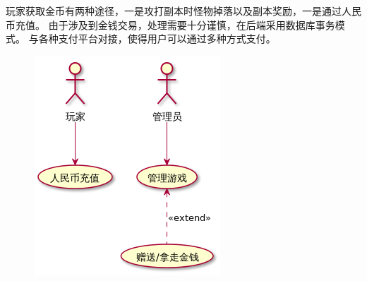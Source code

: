 \documentclass{article}
\begin{document}
\noindent{}玩家获取金币有两种途径，一是攻打副本时怪物掉落以及副本奖励，一是通过人民币充值。 由于涉及到金钱交易，处理需要十分谨慎，在后端采用数据库事务模式。 与各种支付平台对接，使得用户可以通过多种方式支付。%

\begin{figure}[tbp]%
\begin{mdcenter}%

\noindent{}\includegraphics[keepaspectratio=true,width=\dimwidth{0.50}]{./img/3}{}%

\mdhr{}%

\noindent{}%
\end{mdcenter}%
\end{figure}%
\end{document}
